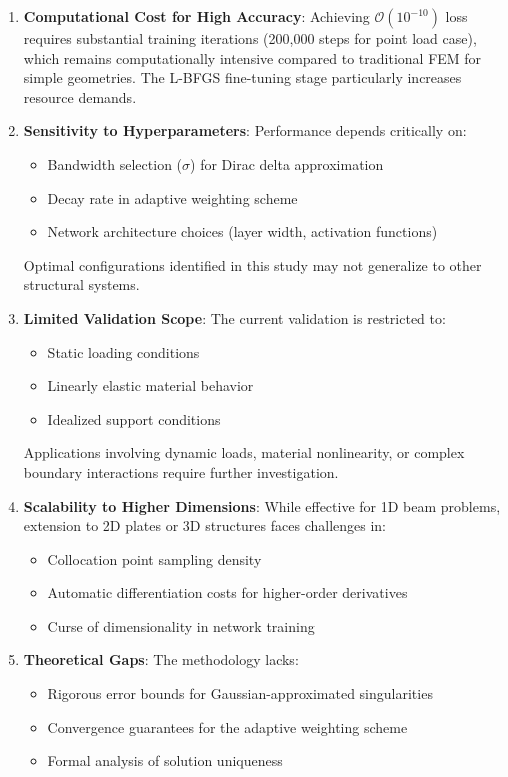 \documentclass[12pt]{article}
\begin{document}
\begin{enumerate}
	\item \textbf{Computational Cost for High Accuracy}: Achieving $\mathcal{O}(10^{-10})$ loss requires substantial training iterations (200,000 steps for point load case), which remains computationally intensive compared to traditional FEM for simple geometries. The L-BFGS fine-tuning stage particularly increases resource demands.

\item \textbf{Sensitivity to Hyperparameters}: Performance depends critically on:

\begin{itemize}
	\item Bandwidth selection ($\sigma$) for Dirac delta approximation
\item Decay rate in adaptive weighting scheme
\item Network architecture choices (layer width, activation functions)
\end{itemize}
Optimal configurations identified in this study may not generalize to other structural systems.

\item \textbf{Limited Validation Scope}: The current validation is restricted to:
\begin{itemize}
	\item Static loading conditions
\item Linearly elastic material behavior
\item Idealized support conditions
\end{itemize}
Applications involving dynamic loads, material nonlinearity, or complex boundary interactions require further investigation.

\item \textbf{Scalability to Higher Dimensions}: While effective for 1D beam problems, extension to 2D plates or 3D structures faces challenges in:
\begin{itemize}
	\item Collocation point sampling density
\item Automatic differentiation costs for higher-order derivatives
\item Curse of dimensionality in network training
\end{itemize}


\item \textbf{Theoretical Gaps}: The methodology lacks:
\begin{itemize}
	\item Rigorous error bounds for Gaussian-approximated singularities
\item Convergence guarantees for the adaptive weighting scheme
\item Formal analysis of solution uniqueness
\end{itemize}



\end{enumerate}
\end{document}
